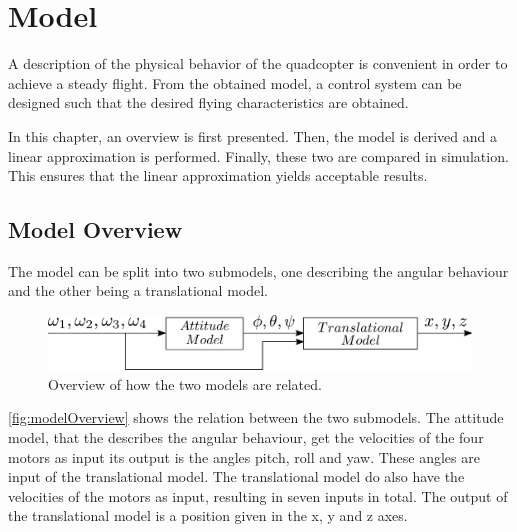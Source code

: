 \chapter{Model}\label{chap:Model}
A description of the physical behavior of the quadcopter is convenient in order to achieve a steady flight. From the obtained model, a control system can be designed such that the desired flying characteristics are obtained.

In this chapter, an overview is first presented. Then, the model is derived and a linear approximation is performed. Finally, these two are compared in simulation. This ensures that the linear approximation yields acceptable results.

\section{Model Overview} \label{sec:ModelOverview}
The model can be split into two submodels, one describing the angular behaviour and the other being a translational model.
\begin{figure}[H]
    \centering
    \includegraphics[scale=0.3]{figures/modelOverview}
    \caption{Overview of how the two models are related.}
    \label{fig:modelOverview}
\end{figure}
%
\autoref{fig:modelOverview} shows the relation between the two submodels. The attitude model, that the describes the angular behaviour, get the velocities of the four motors as input its output is the angles pitch, roll and yaw. These angles are input of the translational model. The translational model do also have the velocities of the motors as input, resulting in seven inputs in total. The output of the translational model is a position given in the x, y and z axes.

